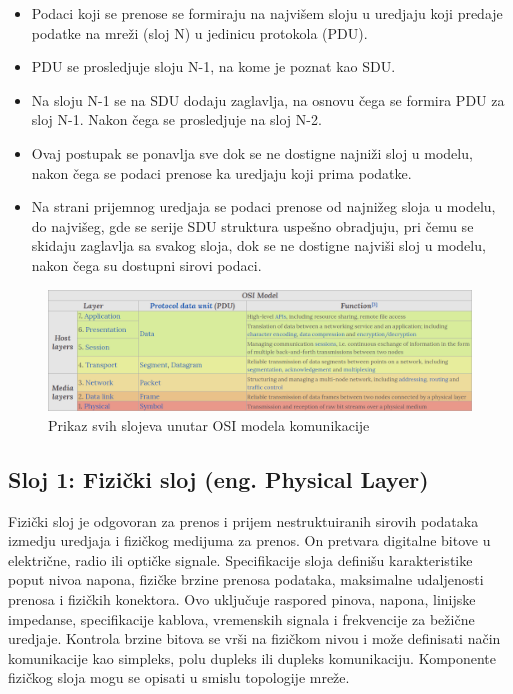 \documentclass[a4paper,12pt, master]{etf}
\begin{document}
	\begin{itemize}
		\item Podaci koji se prenose se formiraju na najvi\v{s}em sloju u
		uredjaju koji predaje podatke na mre\v{z}i (sloj N) u jedinicu
		protokola (PDU).
		\item PDU se prosledjuje sloju N-1, na kome je poznat kao SDU.
		\item Na sloju N-1 se na SDU dodaju zaglavlja, na osnovu \v{c}ega se
		formira PDU za sloj N-1. Nakon \v{c}ega se prosledjuje na sloj N-2.
		\item Ovaj postupak se ponavlja sve dok se ne dostigne najni\v{z}i sloj
		u modelu, nakon	\v{c}ega se podaci prenose ka uredjaju koji prima
		podatke.
		\item Na strani prijemnog uredjaja se podaci prenose od najni\v{z}eg
		sloja u modelu, do najvi\v{s}eg, gde se serije SDU struktura
		uspe\v{s}no obradjuju, pri \v{c}emu se skidaju zaglavlja sa svakog
		sloja, dok se ne dostigne najvi\v{s}i sloj u modelu, nakon \v{c}ega su
		dostupni sirovi podaci.
	\end{itemize}

	\begin{figure}[htb]
		\centering
		\includegraphics[scale=.43]{../pic/osi_model.png}
		\caption{Prikaz svih slojeva unutar OSI modela komunikacije}
		\label{fig:osi_model}
	\end{figure}

	\subsection{Sloj 1: Fizi\v{c}ki sloj (eng\@. Physical Layer)}

	Fizi\v{c}ki sloj je odgovoran za prenos i prijem nestruktuiranih sirovih
	podataka izmedju uredjaja i fizi\v{c}kog medijuma za prenos. On pretvara
	digitalne bitove u elektri\v{c}ne, radio ili opti\v{c}ke signale.
	Specifikacije sloja defini\v{s}u karakteristike poput nivoa napona,
	fizi\v{c}ke brzine prenosa podataka, maksimalne udaljenosti prenosa i
	fizi\v{c}kih konektora. Ovo	uklju\v{c}uje raspored pinova, napona, linijske
	impedanse, specifikacije kablova, vremenskih signala i frekvencije za
	be\v{z}i\v{c}ne uredjaje. Kontrola brzine bitova se vr\v{s}i na fizi\v{c}kom
	nivou i mo\v{z}e definisati na\v{c}in komunikacije kao simpleks, polu
	dupleks ili dupleks	komunikaciju. Komponente fizi\v{c}kog sloja mogu se
	opisati u smislu topologije mre\v{z}e.
\end{document}
